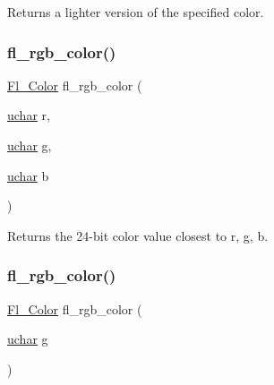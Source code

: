 Returns a lighter version of the specified color. \mbox{\label{_enumerations_8_h_a7c5acc4633fbab7016bce2fb69046494}} 
\subsubsection{\texorpdfstring{fl\+\_\+rgb\+\_\+color()}{fl\_rgb\_color()}\hspace{0.1cm}{\footnotesize\ttfamily [1/2]}}
{\footnotesize\ttfamily \hyperlink{_enumerations_8_h_a8b762953646f8abee866061f1af78a6a}{Fl\+\_\+\+Color} fl\+\_\+rgb\+\_\+color (\begin{DoxyParamCaption}\item[{\hyperlink{fl__types_8h_a65f85814a8290f9797005d3b28e7e5fc}{uchar}}]{r,  }\item[{\hyperlink{fl__types_8h_a65f85814a8290f9797005d3b28e7e5fc}{uchar}}]{g,  }\item[{\hyperlink{fl__types_8h_a65f85814a8290f9797005d3b28e7e5fc}{uchar}}]{b }\end{DoxyParamCaption})\hspace{0.3cm}{\ttfamily [inline]}}

Returns the 24-\/bit color value closest to {\ttfamily r}, {\ttfamily g}, {\ttfamily b}. \mbox{\label{_enumerations_8_h_af26a6486e65decd723fbe5c1f43deb0b}} 
\subsubsection{\texorpdfstring{fl\+\_\+rgb\+\_\+color()}{fl\_rgb\_color()}\hspace{0.1cm}{\footnotesize\ttfamily [2/2]}}
{\footnotesize\ttfamily \hyperlink{_enumerations_8_h_a8b762953646f8abee866061f1af78a6a}{Fl\+\_\+\+Color} fl\+\_\+rgb\+\_\+color (\begin{DoxyParamCaption}\item[{\hyperlink{fl__types_8h_a65f85814a8290f9797005d3b28e7e5fc}{uchar}}]{g }\end{DoxyParamCaption})\hspace{0.3cm}{\ttfamily [inline]}}

